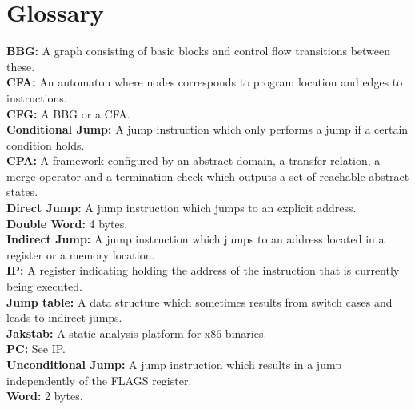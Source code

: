 \documentclass{kththesis}
\begin{document}
\section*{Glossary}
\textbf{BBG:} A graph consisting of basic blocks and control flow transitions between these.\\
\textbf{CFA:} An automaton where nodes corresponds to program location and edges to instructions.\\
\textbf{CFG:} A BBG or a CFA.\\
\textbf{Conditional Jump:} A jump instruction which only performs a jump if a certain condition holds.\\
\textbf{CPA:} A framework configured by an abstract domain, a transfer relation, a merge operator and a termination check which outputs a set of reachable abstract states.\\
\textbf{Direct Jump:} A jump instruction which jumps to an explicit address.\\
\textbf{Double Word:} 4 bytes.\\
\textbf{Indirect Jump:} A jump instruction which jumps to an address located in a register or a memory location.\\
\textbf{IP:} A register indicating holding the address of the instruction that is currently being executed.\\
\textbf{Jump table:} A data structure which sometimes results from switch cases and leads to indirect jumps. \\
\textbf{Jakstab:} A static analysis platform for x86 binaries. \\
\textbf{PC:} See IP.\\
\textbf{Unconditional Jump:} A jump instruction which results in a jump independently of the FLAGS register.\\
\textbf{Word:} 2 bytes.\\

\listoffigures
\thispagestyle{empty}
 
\listoftables
\thispagestyle{empty}

\mainmatter
\cleardoublepage
{}

\end{document}
